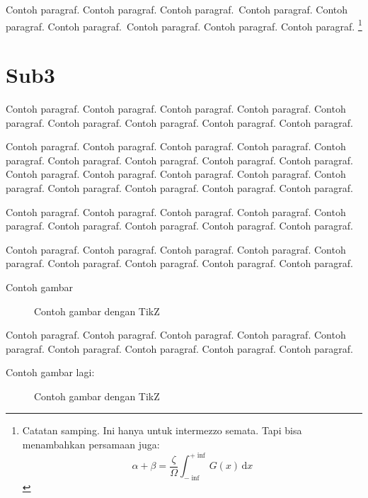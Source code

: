 \documentclass[twoside,bahasa]{tufte-book}
\begin{document}
Contoh paragraf. Contoh paragraf. Contoh paragraf.~Contoh paragraf.
Contoh paragraf. Contoh paragraf.~Contoh paragraf. Contoh paragraf.
Contoh paragraf.
\footnote{Catatan samping. Ini hanya untuk
intermezzo semata. Tapi bisa menambahkan persamaan juga:
\begin{equation}
\alpha + \beta = \frac{\zeta}{\Omega} \int_{-\inf}^{+\inf} G(x)\,\mathrm{d}x
\end{equation}
}


\section{Sub3}

Contoh paragraf. Contoh paragraf. Contoh paragraf. Contoh paragraf.
Contoh paragraf. Contoh paragraf. Contoh paragraf. Contoh paragraf.
Contoh paragraf.

Contoh paragraf. Contoh paragraf. Contoh paragraf. Contoh paragraf.
Contoh paragraf. Contoh paragraf. Contoh paragraf. Contoh paragraf.
Contoh paragraf.
Contoh paragraf. Contoh paragraf. Contoh paragraf. Contoh paragraf.
Contoh paragraf. Contoh paragraf. Contoh paragraf. Contoh paragraf.
Contoh paragraf.

Contoh paragraf. Contoh paragraf. Contoh paragraf. Contoh paragraf.
Contoh paragraf. Contoh paragraf. Contoh paragraf. Contoh paragraf.
Contoh paragraf.

Contoh paragraf. Contoh paragraf. Contoh paragraf. Contoh paragraf.
Contoh paragraf. Contoh paragraf. Contoh paragraf. Contoh paragraf.
Contoh paragraf.

Contoh gambar
\begin{figure}[h]
\caption{Contoh gambar dengan TikZ}
\end{figure}

Contoh paragraf. Contoh paragraf. Contoh paragraf. Contoh paragraf.
Contoh paragraf. Contoh paragraf. Contoh paragraf. Contoh paragraf.
Contoh paragraf.


Contoh gambar lagi:
\begin{figure}[h]
{\centering
{}
\par
}
\caption{Contoh gambar dengan TikZ}
\end{figure}
\end{document}
